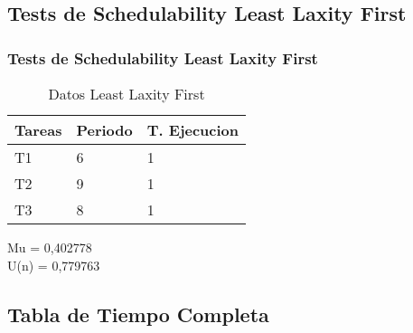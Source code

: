 \documentclass[xcolor=table]{beamer}
\begin{document}
\subsection{Tests de Schedulability  Least Laxity First } 

\begin{frame} 
\frametitle{Tests de Schedulability  Least Laxity First } 
\begin{table} 
\centering 
\begin{tabular}{|l|l|l|} 
\hline 
Tareas & Periodo & T. Ejecucion \\ \hline 
T1   & 6  &  1\\ \hline 
T2   & 9  &  1\\ \hline 
T3   & 8  &  1\\ \hline 
\end{tabular} 
\caption{Datos  Least Laxity First } 
\end{table} 
Mu =  0,402778 \\ 
U(n) =  0,779763 \\ 
\end{frame} 

\subsection{Tabla de Tiempo Completa} 
\end{document}
